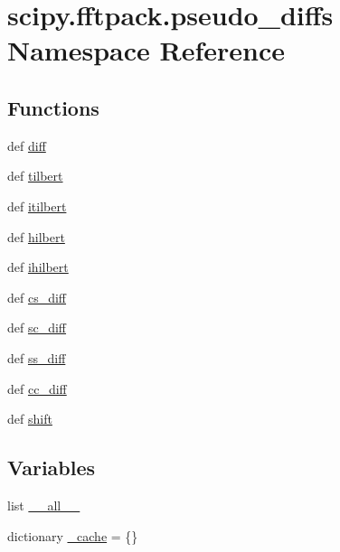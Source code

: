 \hypertarget{namespacescipy_1_1fftpack_1_1pseudo__diffs}{}\section{scipy.\+fftpack.\+pseudo\+\_\+diffs Namespace Reference}
\label{namespacescipy_1_1fftpack_1_1pseudo__diffs}
\subsection*{Functions}
\begin{DoxyCompactItemize}
\item 
def \hyperlink{namespacescipy_1_1fftpack_1_1pseudo__diffs_adb9f63fe09163beab2b77d8c8b5ca299}{diff}
\item 
def \hyperlink{namespacescipy_1_1fftpack_1_1pseudo__diffs_a7d94b849d40ac9ce79d70227a953f26c}{tilbert}
\item 
def \hyperlink{namespacescipy_1_1fftpack_1_1pseudo__diffs_afee349b2f57baa5a9eada13f39d0c8a7}{itilbert}
\item 
def \hyperlink{namespacescipy_1_1fftpack_1_1pseudo__diffs_a18485d25af8944034dced75db40e835c}{hilbert}
\item 
def \hyperlink{namespacescipy_1_1fftpack_1_1pseudo__diffs_a7eb238c1593a8e0577e934692fc75782}{ihilbert}
\item 
def \hyperlink{namespacescipy_1_1fftpack_1_1pseudo__diffs_a19bff218b7c5b2a4437d12acc8c3bba4}{cs\+\_\+diff}
\item 
def \hyperlink{namespacescipy_1_1fftpack_1_1pseudo__diffs_a0160afb72f1f469673ac034d886b22f3}{sc\+\_\+diff}
\item 
def \hyperlink{namespacescipy_1_1fftpack_1_1pseudo__diffs_a2c19470883e518246d275790e4e9c01b}{ss\+\_\+diff}
\item 
def \hyperlink{namespacescipy_1_1fftpack_1_1pseudo__diffs_af7bf913b255a3e27b2417f6807923743}{cc\+\_\+diff}
\item 
def \hyperlink{namespacescipy_1_1fftpack_1_1pseudo__diffs_ac3d3fb65d79a12ba90299dc3411b825f}{shift}
\end{DoxyCompactItemize}
\subsection*{Variables}
\begin{DoxyCompactItemize}
\item 
list \hyperlink{namespacescipy_1_1fftpack_1_1pseudo__diffs_a66deb77dd40743d440d6a71eb71341a2}{\+\_\+\+\_\+all\+\_\+\+\_\+}
\item 
dictionary \hyperlink{namespacescipy_1_1fftpack_1_1pseudo__diffs_adb08a0217dd62951147e1c426b48a575}{\+\_\+cache} = \{\}
\end{DoxyCompactItemize}


